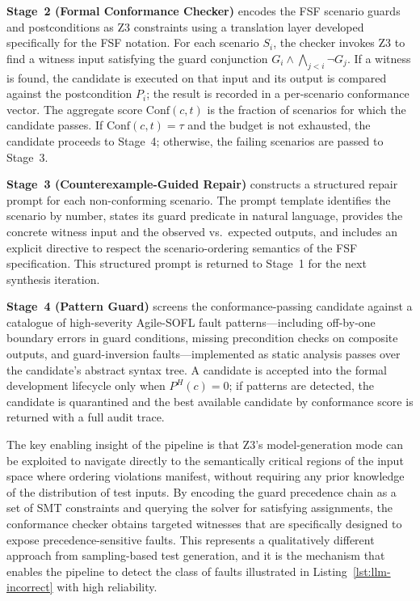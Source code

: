 \textbf{Stage~2 (Formal Conformance Checker)} encodes the FSF scenario guards and postconditions as Z3 constraints \citep{demoura2008z3} using a translation layer developed specifically for the FSF notation.  For each scenario $S_i$, the checker invokes Z3 to find a witness input satisfying the guard conjunction $G_i \wedge \bigwedge_{j < i} \neg G_j$.  If a witness is found, the candidate is executed on that input and its output is compared against the postcondition $P_i$; the result is recorded in a per-scenario conformance vector.  The aggregate score $\mathrm{Conf}(c, t)$ is the fraction of scenarios for which the candidate passes.  If $\mathrm{Conf}(c, t) = \tau$ and the budget is not exhausted, the candidate proceeds to Stage~4; otherwise, the failing scenarios are passed to Stage~3.

\textbf{Stage~3 (Counterexample-Guided Repair)} constructs a structured repair prompt for each non-conforming scenario.  The prompt template identifies the scenario by number, states its guard predicate in natural language, provides the concrete witness input and the observed vs.\ expected outputs, and includes an explicit directive to respect the scenario-ordering semantics of the FSF specification.  This structured prompt is returned to Stage~1 for the next synthesis iteration.

\textbf{Stage~4 (Pattern Guard)} screens the conformance-passing candidate against a catalogue of high-severity Agile-SOFL fault patterns—including off-by-one boundary errors in guard conditions, missing precondition checks on composite outputs, and guard-inversion faults—implemented as static analysis passes over the candidate's abstract syntax tree.  A candidate is accepted into the formal development lifecycle only when $P^H(c) = 0$; if patterns are detected, the candidate is quarantined and the best available candidate by conformance score is returned with a full audit trace.

The key enabling insight of the pipeline is that Z3's model-generation mode can be exploited to navigate directly to the semantically critical regions of the input space where ordering violations manifest, without requiring any prior knowledge of the distribution of test inputs.  By encoding the guard precedence chain as a set of SMT constraints and querying the solver for satisfying assignments, the conformance checker obtains targeted witnesses that are specifically designed to expose precedence-sensitive faults.  This represents a qualitatively different approach from sampling-based test generation, and it is the mechanism that enables the pipeline to detect the class of faults illustrated in Listing~\ref{lst:llm-incorrect} with high reliability.

